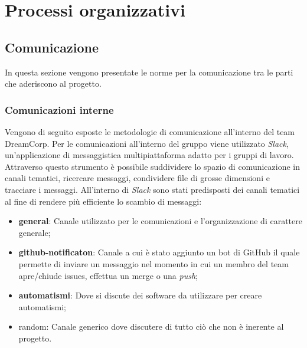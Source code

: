 \section{Processi organizzativi}
    \subsection{Comunicazione}
        In questa sezione vengono presentate le norme per la comunicazione tra le parti che aderiscono al progetto.
        \subsubsection{Comunicazioni interne}
            Vengono di seguito esposte le metodologie di comunicazione all'interno del team DreamCorp.
            \newline
            Per le comunicazioni all'interno del gruppo viene utilizzato \textit{Slack}\pedice, un'applicazione di messaggistica multipiattaforma adatto per i gruppi di lavoro. Attraverso questo strumento è possibile suddividere lo spazio di comunicazione in canali tematici, ricercare messaggi, condividere file di grosse dimensioni e tracciare i messaggi.
            \newline
            All'interno di \textit{Slack} sono stati predisposti dei canali tematici al fine di rendere più efficiente lo scambio di messaggi:
            \begin{itemize}
                \item \textbf{general}: Canale utilizzato per le comunicazioni e l'organizzazione di carattere generale;
                \item \textbf{github-notificaton}: Canale a cui è stato aggiunto un bot di GitHub il quale permette di inviare un messaggio nel momento in cui un membro del team apre/chiude issues, effettua un merge o una \textit{push};
                \item \textbf{automatismi}: Dove si discute dei software da utilizzare per creare automatismi;
                \item{random}: Canale generico dove discutere di tutto ciò che non è inerente al progetto.    
            \end{itemize}
            
